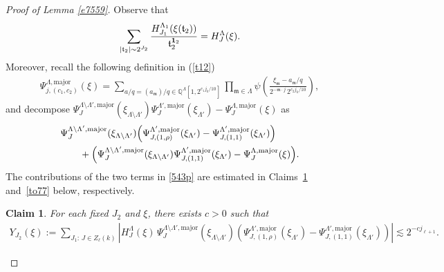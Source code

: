 \documentclass[10pt,a4paper]{amsart}
\newtheorem{claim}{Claim}\numberwithin{claim}{section}
\numberwithin{equation}{section}
\begin{document}
\begin{proof}[Proof of Lemma \ref{e7559}]
Observe that
\begin{align*}
\sum_{|\mathfrak{t}_2|\sim 2^{J_2}}
\frac{ H^{\Lambda_{1}}_{J_1}(\xi(\mathfrak{t}_2))}{\mathfrak{t}_2^{{\bf 1}_2}}
= H^{\Lambda}_{J}(\xi).
\end{align*}
Moreover, recall the following definition in (\ref{t12})
\begin{align*}
		\Psi_{j,(c_1,c_2)}^{\Lambda,\mathrm{major}}(\xi)
		= \sum_{a/q=(a_{\mathfrak{m}})/q \in \mathbb{Q}^{\Lambda}[1,2^{c_1 j_k/10}]}
		\prod_{\mathfrak{m}\in \Lambda} 
		\psi\!\left(
		\frac{\xi_{\mathfrak{m}} - a_{\mathfrak{m}}/q}
		{2^{-\mathfrak{m}\cdot j}\, 2^{c_2 j_k/10}}
		\right),
	\end{align*}
and decompose
$
\Psi_J^{\Lambda\setminus\Lambda',\mathrm{major}}(\xi_{\Lambda\setminus\Lambda'})
\Psi_{J}^{\Lambda',\mathrm{major}}(\xi_{\Lambda'})
-
\Psi_J^{\Lambda,\mathrm{major}}(\xi)
$
as
\begin{align}\label{543p}
&\Psi_J^{\Lambda\setminus\Lambda',\mathrm{major}}(\xi_{\Lambda\setminus\Lambda'})
\Bigl(
\Psi_{J,(1,\rho)}^{\Lambda',\mathrm{major}}(\xi_{\Lambda'})
-
\Psi_{J,(1,1)}^{\Lambda',\mathrm{major}}(\xi_{\Lambda'})
\Bigr)\\
&\qquad
+
\Bigl(
\Psi_J^{\Lambda\setminus\Lambda',\mathrm{major}}(\xi_{\Lambda\setminus\Lambda'})
\Psi_{J,(1,1)}^{\Lambda',\mathrm{major}}(\xi_{\Lambda'})
-
\Psi_J^{\Lambda,\mathrm{major}}(\xi)
\Bigr).\nonumber
\end{align}
The contributions of the two terms in \eqref{543p} are estimated in Claims~\ref{t7} and~\ref{to77} below, respectively.

\begin{claim}\label{t7}
For each fixed $J_2$ and $\xi$, there exists $c>0$ such that
\begin{align*}
Y_{J_2}(\xi)
:=
\sum_{J_1:\, J\in Z_\ell(k)}
\left|
H^{\Lambda}_{J}(\xi)\,
\Psi_J^{\Lambda\setminus\Lambda',\mathrm{major}}(\xi_{\Lambda\setminus\Lambda'})
\left(
\Psi_{J,(1,\rho)}^{\Lambda',\mathrm{major}}(\xi_{\Lambda'})
-
\Psi_{J,(1,1)}^{\Lambda',\mathrm{major}}(\xi_{\Lambda'})
\right)
\right|
\lesssim 2^{-c j_{\ell+1}}.
\end{align*}
\end{claim}
 



\end{proof}
\end{document}
